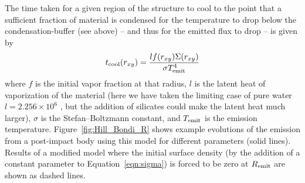 \documentclass[sn-nature,oneside]{sn-jnl}%
\def\mnras{Mon. Not. R. Astron. Soc.}
\begin{document}
%
The time taken for a given region of the structure to cool to the point that a sufficient fraction of material is condensed for the temperature to drop below the condensation-buffer (see above) -- and thus for the emitted flux to drop -- is given by
%
\begin{equation}
    t_{\rm cool} (r_{xy})=\frac{l f(r_{xy}) \Sigma(r_{xy})}{\sigma T^4_{\rm emit}}
\end{equation}
%
where $f$ is the initial vapor fraction at that radius, $l$ is the latent heat of vaporization of the material (here we have taken the limiting case of pure water $l=2.256\times 10^6$ \cite{Chase1998}, but the addition of silicates could make the latent heat much larger), $\sigma$ is the Stefan–Boltzmann constant, and $T_{\rm emit}$ is the emission temperature.
%
Figure~\ref{fig:Hill_Bondi_R} shows example evolutions of the emission from a post-impact body using this model for different parameters (solid lines).
%
Results of a modified model where the initial surface density (by the addition of a constant parameter to Equation~\ref{eqn:sigma}) is forced to be zero at $R_{\rm emit}$ are shown as dashed lines.







\end{document}
